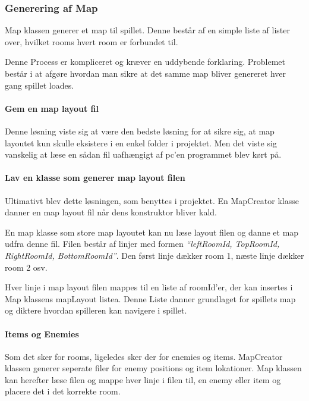 \subsubsection{Generering af Map}
\noindent Map klassen generer et map til spillet. Denne består af en
simple liste af lister over, hvilket rooms hvert room er 
forbundet til.

Denne Process er kompliceret og kræver en uddybende forklaring. Problemet 
består i at afgøre hvordan man sikre at det samme map bliver genereret
hver gang spillet loades. 

\paragraph{Gem en map layout fil \\}
Denne løsning viste sig at være den bedste løsning for at sikre sig, at 
map layoutet kun skulle eksistere i en enkel folder i projektet.
Men det viste sig vanskelig at læse en sådan fil uafhængigt af pc'en 
programmet blev kørt på.

\paragraph{Lav en klasse som generer map layout filen \\}
Ultimativt blev dette løsningen, som benyttes i projektet. En MapCreator
klasse danner en map layout fil når dens konstruktor bliver kald.

En map klasse som store map layoutet kan nu læse layout filen og 
danne et map udfra denne fil.
Filen består af linjer med formen \textit{``leftRoomId, TopRoomId, RightRoomId, BottomRoomId''}. Den først linje dækker room 1, næste linje dækker room 2 osv.

Hver linje i map layout filen mappes til en liste af roomId'er,  der kan insertes i Map
klassens mapLayout listea. Denne Liste danner grundlaget for spillets map og 
diktere hvordan spilleren kan navigere i spillet.

\paragraph{Items og Enemies \\}
Som det sker for rooms, ligeledes sker der for enemies og items. MapCreator klassen
generer seperate filer for enemy positions og item lokationer. Map klassen 
kan herefter læse filen og mappe hver linje i filen til, en enemy eller item og 
placere det i det korrekte room.




